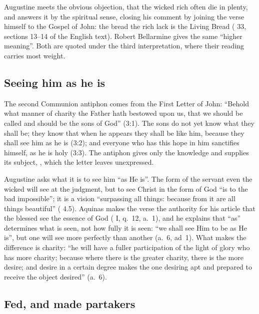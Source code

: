 Augustine meets the obvious objection, that the wicked rich often die in
plenty, and answers it by the spiritual sense, closing his comment by joining
the verse himself to the Gospel of John: the bread the rich lack is the Living
Bread ( 33, sections 13--14 of the English
text). Robert Bellarmine gives the same ``higher meaning''. Both are quoted
under the third interpretation, where their reading carries most weight.

\subsection{Seeing him as he is}

The second Communion antiphon comes from the First Letter of John: ``Behold
what manner of charity the Father hath bestowed upon us, that we should be
called and should be the sons of God'' (3:1). The sons do not yet know what
they shall be; they know that when he appears they shall be like him, because
they shall see him as he is (3:2); and everyone who has this hope in him
sanctifies himself, as he is holy (3:3). The antiphon gives only the knowledge
and supplies its subject, , which the letter leaves unexpressed.

Augustine asks what it is to see him ``as He is''. The form of the servant
even the wicked will see at the judgment, but to see Christ in the form of God
``is to the bad impossible''; it is a vision ``surpassing all things: because
from it are all things beautiful'' ( 4.5). Aquinas makes the verse the authority for his article that the
blessed see the essence of God ( I, q.~12, a.~1), and he
explains that ``as'' determines what is seen, not how fully it is seen: ``we
shall see Him to be as He is'', but one will see more perfectly than another
(a.~6, ad~1). What makes the difference is charity: ``he will have a fuller
participation of the light of glory who has more charity; because where there
is the greater charity, there is the more desire; and desire in a certain
degree makes the one desiring apt and prepared to receive the object desired''
(a.~6).

\subsection{Fed, and made partakers}

